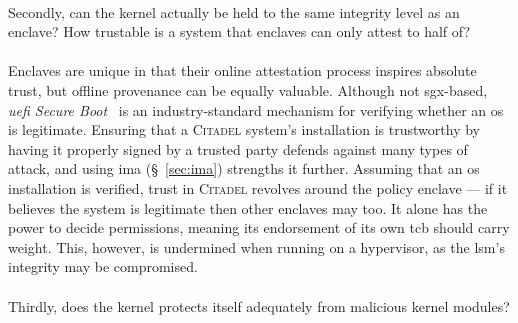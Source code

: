 \paragraph{} Secondly, can the kernel actually be held to the same integrity level as an enclave? How trustable is a system that enclaves can only attest to half of?

\paragraph{} Enclaves are unique in that their online attestation process inspires absolute trust, but offline provenance can be equally valuable. Although not \acrshort{sgx}-based, \textit{\acrshort{uefi} Secure Boot}~\cite{Richardson2013UefiSB} is an industry-standard mechanism for verifying whether an \acrshort{os} is legitimate. Ensuring that a \textsc{Citadel} system's installation is trustworthy by having it properly signed by a trusted party defends against many types of attack, and using \acrshort{ima} (§~\ref{sec:ima}) strengths it further. Assuming that an \acrshort{os} installation is verified, trust in \textsc{Citadel} revolves around the policy enclave ---  if it believes the system is legitimate then other enclaves may too. It alone has the power to decide permissions, meaning its endorsement of its own \acrshort{tcb} should carry weight. This, however, is undermined when running on a hypervisor, as the \acrshort{lsm}'s integrity may be compromised.


\paragraph{} Thirdly, does the kernel protects itself adequately from malicious kernel modules?

